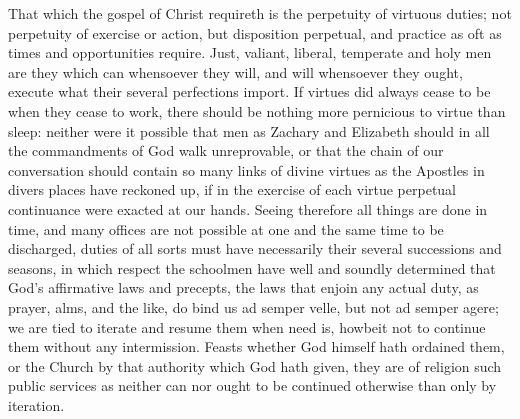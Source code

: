 That which the gospel of Christ requireth is the perpetuity of virtuous duties; not perpetuity of exercise or action, but disposition perpetual, and practice as oft as times and opportunities require. Just, valiant, liberal, temperate and holy men are they which can whensoever they will, and will whensoever  they ought, execute what their several perfections import. If virtues did always cease to be when they cease to work, there should be nothing more pernicious to virtue than sleep: neither were it possible that men as Zachary and Elizabeth should in all the commandments of God walk unreprovable, or that the chain of our conversation should contain so many links of divine virtues as the Apostles in divers places have reckoned up, if in the exercise of each virtue perpetual continuance were exacted at our hands. Seeing therefore all things are done in time, and many offices are not possible at one and the same time to be discharged, duties of all sorts must have necessarily their several successions and seasons, in which respect the schoolmen have well and soundly determined that God’s affirmative laws and precepts, the laws that enjoin any actual duty, as prayer, alms, and the like, do bind us ad semper velle, but not ad semper agere; we are tied to iterate and resume them when need is, howbeit not to continue them without any intermission. Feasts whether God himself hath ordained them, or the Church by that authority which God hath given, they are of religion such public services as neither can nor ought to be continued otherwise than only by iteration.

